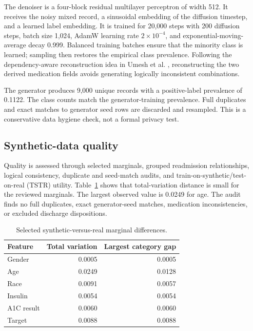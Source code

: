 \documentclass[11pt]{article}
\begin{document}
The denoiser is a four-block residual multilayer perceptron of width 512. It receives the
noisy mixed record, a sinusoidal embedding of the diffusion timestep, and a learned label
embedding. It is trained for 20,000 steps with 200 diffusion steps, batch size 1,024,
AdamW learning rate $2\times10^{-4}$, and exponential-moving-average decay 0.999.
Balanced training batches ensure that the minority class is learned; sampling then restores
the empirical class prevalence. Following the dependency-aware reconstruction idea in
Umesh et al. \cite{hfgf}, reconstructing the two derived medication fields avoids
generating logically inconsistent combinations.

The generator produces 9,000 unique records with a positive-label prevalence of 0.1122.
The class counts match the generator-training prevalence. Full duplicates and exact
matches to generator seed rows are discarded and resampled. This is a conservative data
hygiene check, not a formal privacy test.

\subsection{Synthetic-data quality}

Quality is assessed through selected marginals, grouped readmission relationships,
logical consistency, duplicate and seed-match audits, and train-on-synthetic/test-on-real
(TSTR) utility. Table~\ref{tab:marginals} shows that total-variation distance is small for
the reviewed marginals. The largest observed value is 0.0249 for age. The audit finds no
full duplicates, exact generator-seed matches, medication inconsistencies, or excluded
discharge dispositions.

\begin{table}[htbp]
\centering
\caption{Selected synthetic-versus-real marginal differences.}
\label{tab:marginals}
\begin{tabular}{lrr}
\toprule
Feature & Total variation & Largest category gap \\
\midrule
Gender & 0.0005 & 0.0005 \\
Age & 0.0249 & 0.0128 \\
Race & 0.0091 & 0.0057 \\
Insulin & 0.0054 & 0.0054 \\
A1C result & 0.0060 & 0.0060 \\
Target & 0.0088 & 0.0088 \\
\bottomrule
\end{tabular}
\end{table}
\end{document}
